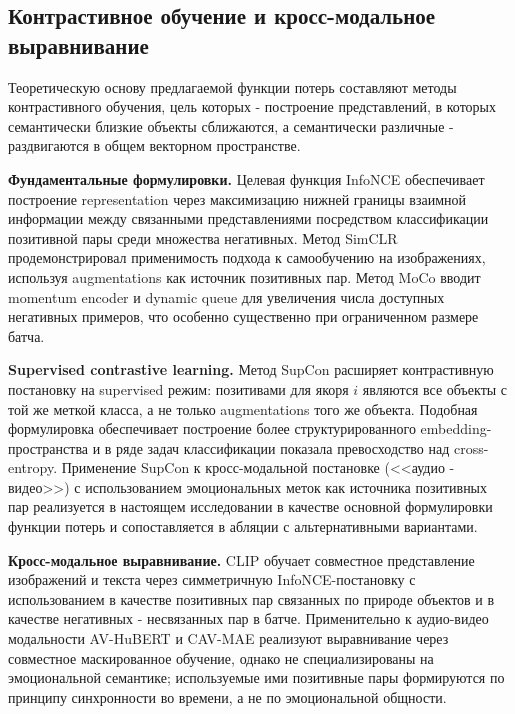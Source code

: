 \documentclass[a4paper, 12pt, oneside, openany]{article}
\begin{document}
\subsection{Контрастивное обучение и кросс-модальное выравнивание}

Теоретическую основу предлагаемой функции потерь составляют методы контрастивного обучения, цель которых - построение представлений, в которых семантически близкие объекты сближаются, а семантически различные - раздвигаются в общем векторном пространстве.

\textbf{Фундаментальные формулировки.} Целевая функция InfoNCE \cite{vandenoord2018infonce} обеспечивает построение representation через максимизацию нижней границы взаимной информации между связанными представлениями посредством классификации позитивной пары среди множества негативных. Метод SimCLR \cite{chen2020simclr} продемонстрировал применимость подхода к самообучению на изображениях, используя augmentations как источник позитивных пар. Метод MoCo \cite{he2020moco} вводит momentum encoder и dynamic queue для увеличения числа доступных негативных примеров, что особенно существенно при ограниченном размере батча.

\textbf{Supervised contrastive learning.} Метод SupCon \cite{khosla2020supcon} расширяет контрастивную постановку на supervised режим: позитивами для якоря $i$ являются все объекты с той же меткой класса, а не только augmentations того же объекта. Подобная формулировка обеспечивает построение более структурированного embedding-пространства и в ряде задач классификации показала превосходство над cross-entropy. Применение SupCon к кросс-модальной постановке (<<аудио - видео>>) с использованием эмоциональных меток как источника позитивных пар реализуется в настоящем исследовании в качестве основной формулировки функции потерь и сопоставляется в абляции с альтернативными вариантами.

\textbf{Кросс-модальное выравнивание.} CLIP \cite{radford2021clip} обучает совместное представление изображений и текста через симметричную InfoNCE-постановку с использованием в качестве позитивных пар связанных по природе объектов и в качестве негативных - несвязанных пар в батче. Применительно к аудио-видео модальности AV-HuBERT \cite{shi2022avhubert} и CAV-MAE \cite{gong2023cavmae} реализуют выравнивание через совместное маскированное обучение, однако не специализированы на эмоциональной семантике; используемые ими позитивные пары формируются по принципу синхронности во времени, а не по эмоциональной общности.
\end{document}
